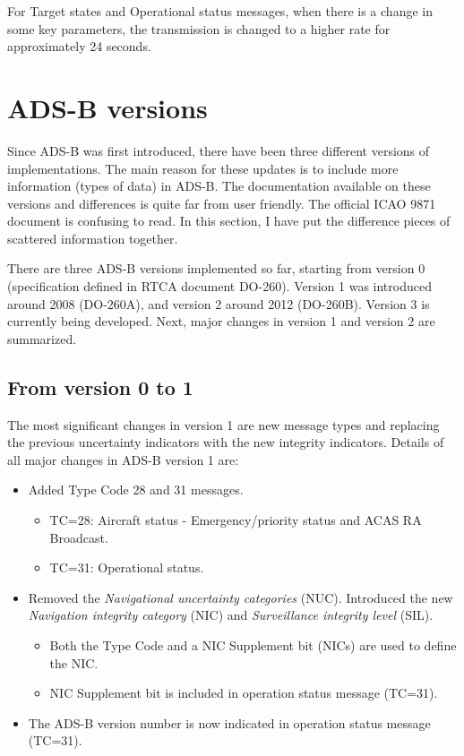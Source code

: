 For Target states and Operational status messages, when there is a change in some key parameters, the transmission is changed to a higher rate for approximately 24 seconds.




\section{ADS-B versions}

Since ADS-B was first introduced, there have been three different versions of implementations. The main reason for these updates is to include more information (types of data) in ADS-B. The documentation available on these versions and differences is quite far from user friendly. The official ICAO 9871 document \cite{icao9871v1} is confusing to read. In this section, I have put the difference pieces of scattered information together.

There are three ADS-B versions implemented so far, starting from version 0 (specification defined in RTCA document DO-260). Version 1 was introduced around 2008 (DO-260A), and version 2 around 2012 (DO-260B). Version 3 is currently being developed. Next, major changes in version 1 and version 2 are summarized.

\subsection{From version 0 to 1}

The most significant changes in version 1 are new message types and replacing the previous uncertainty indicators with the new integrity indicators. Details of all major changes in ADS-B version 1 are:

\begin{itemize}
  \item Added Type Code 28 and 31 messages.

  \begin{itemize}
    \item TC=28: Aircraft status - Emergency/priority status and ACAS RA Broadcast.
    \item TC=31: Operational status.
  \end{itemize}

  \item Removed the \emph{Navigational uncertainty categories} (NUC). Introduced the new \emph{Navigation integrity category} (NIC) and \emph{Surveillance integrity level} (SIL).

  \begin{itemize}
    \item Both the Type Code and a NIC Supplement bit (NICs) are used to define the NIC.
    \item NIC Supplement bit is included in operation status message (TC=31).
  \end{itemize}

  \item The ADS-B version number is now indicated in operation status message (TC=31).
\end{itemize}

